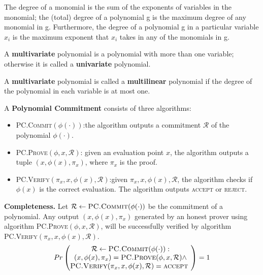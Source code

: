 \begin{definition}
The degree of a monomial is the sum of the exponents of variables in the monomial; the (total) degree of a polynomial g is the maximum degree of any monomial in g. Furthermore, the degree of a polynomial g in a particular variable $x_i$ is the maximum exponent that $x_i$ takes in any of the monomials in g.
\end{definition}

\begin{definition}
A \textbf{multivariate} polynomial is a polynomial with more than one variable; otherwise it is called a \textbf{univariate} polynomial.
\end{definition}

\begin{definition}
A \textbf{multivariate} polynomial is called a \textbf{multilinear} polynomial if the degree of the polynomial in each variable is at most one.
\end{definition}

\begin{definition}
A \textbf{Polynomial Commitment} consists of three algorithms:

\begin{itemize}
    \item \textsc{PC.Commit}$(\phi(\cdot))$:the algorithm outputs a commitment $\mathcal{R}$ of the polynomial $\phi(\cdot)$.
    \item \textsc{PC.Prove}$(\phi, x, \mathcal{R})$: given an evaluation point $x$, the algorithm outputs a tuple $(x, \phi(x),\pi_x)$, where $\pi_x$ is the proof.
    \item \textsc{PC.Verify}$(\pi_x, x, \phi(x), \mathcal{R})$:given $\pi_x, x, \phi(x), \mathcal{R}$, the algorithm checks if $\phi(x)$ is the correct evaluation. The algorithm outputs \textsc{accept} or \textsc{reject}.
\end{itemize}

\end{definition}

\textbf{Completeness.} Let $\mathcal{R} \leftarrow \textsc{PC.Commit}(\phi(\cdot))$ be the commitment of a polynomial. Any output $(x, \phi(x),\pi_x)$ generated by an honest prover using algorithm \textsc{PC.Prove}$(\phi, x, \mathcal{R})$, will be successfully verified by algorithm \textsc{PC.Verify}$(\pi_x, x, \phi(x), \mathcal{R})$.
$$
Pr
\begin{pmatrix}
 \mathcal{R} \leftarrow \textsc{PC.Commit}(\phi(\cdot)): \\
 (x, \phi(x),\pi_x) = \textsc{PC.Prove}(\phi, x, \mathcal{R}) \wedge \\
 \textsc{PC.Verify}(\pi_x, x, \phi(x), \mathcal{R}) = \textsc{accept }
\end{pmatrix}
= 1
$$


